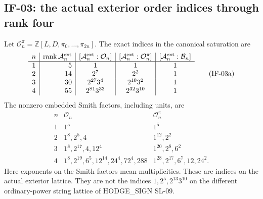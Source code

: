 \subsection{IF-03: the actual exterior order indices through rank four}
Let $\mathcal O_n^\pi=\mathbb Z[L,D,\pi_0,\ldots,\pi_{2n}]$.
The exact indices in the canonical saturation are
\[
\begin{array}{c|r|c|c|c}
 n&\operatorname{rank}\mathcal A_n^{\rm ext}
 &[\mathcal A_n^{\rm ext}:\mathcal O_n]
 &[\mathcal A_n^{\rm ext}:\mathcal O_n^\pi]
 &[\mathcal A_n^{\rm ext}:\mathcal B_n]\\\hline
 1&5&1&1&1\\
 2&14&2^7&2^2&1\\
 3&30&2^{27}3^4&2^{10}3^2&1\\
 4&55&2^{81}3^{33}&2^{32}3^{10}&1
\end{array} \tag{IF-03a}
\]
The nonzero embedded Smith factors, including units, are
\[
\begin{array}{c|l|l}
 n&\mathcal O_n&\mathcal O_n^\pi\\\hline
 1&1^5&1^5\\
 2&1^8,2^5,4&1^{12},2^2\\
 3&1^8,2^{17},4,12^4&1^{20},2^8,6^2\\
 4&1^8,2^{19},6^5,12^{14},24^4,72^4,288
   &1^{28},2^{17},6^7,12,24^2.
\end{array} \tag{IF-03b}
\]
Here exponents on the Smith factors mean multiplicities. These are
indices on the actual exterior lattice. They are not the indices
$1,2^5,2^{13}3^{10}$ on the different ordinary-power string lattice
of HODGE\_SIGN SL-09.

